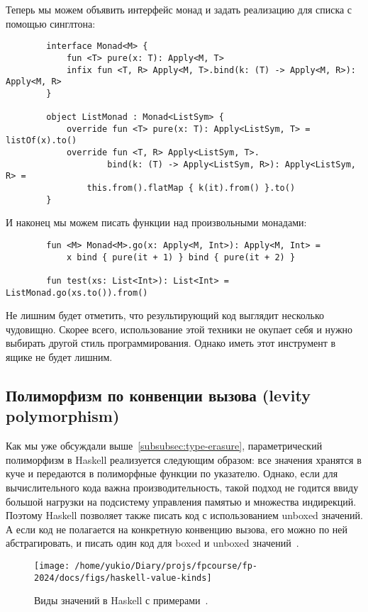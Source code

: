 \documentclass[12pt]{article}
\begin{document}
    Теперь мы можем объявить интерфейс монад и задать реализацию для списка с помощью синглтона:
    \begin{verbatim}
        interface Monad<M> {
            fun <T> pure(x: T): Apply<M, T>
            infix fun <T, R> Apply<M, T>.bind(k: (T) -> Apply<M, R>): Apply<M, R>
        }

        object ListMonad : Monad<ListSym> {
            override fun <T> pure(x: T): Apply<ListSym, T> = listOf(x).to()
            override fun <T, R> Apply<ListSym, T>.
                    bind(k: (T) -> Apply<ListSym, R>): Apply<ListSym, R> =
                this.from().flatMap { k(it).from() }.to()
        }
    \end{verbatim}

    И наконец мы можем писать функции над произвольными монадами:
    \begin{verbatim}
        fun <M> Monad<M>.go(x: Apply<M, Int>): Apply<M, Int> =
            x bind { pure(it + 1) } bind { pure(it + 2) }

        fun test(xs: List<Int>): List<Int> = ListMonad.go(xs.to()).from()
    \end{verbatim}


    Не лишним будет отметить, что результирующий код выглядит несколько чудовищно.
    Скорее всего, использование этой техники не окупает себя и нужно выбирать другой стиль программирования.
    Однако иметь этот инструмент в ящике не будет лишним.

    \subsection{Полиморфизм по конвенции вызова (levity polymorphism)} \label{subsec:levity-polymorphism}

    Как мы уже обсуждали выше~\ref{subsubsec:type-erasure}, параметрический полиморфизм в Haskell реализуется следующим образом: все значения хранятся в куче и передаются в полиморфные функции по указателю.
    Однако, если для вычислительного кода важна производительность, такой подход не годится ввиду большой нагрузки на подсистему управления памятью и множества индирекций.
    Поэтому Haskell позволяет также писать код с использованием unboxed значений.
    А если код не полагается на конкретную конвенцию вызова, его можно по ней абстрагировать, и писать один код для boxed и unboxed значений~\cite{eisenberg2017levity}.

    \begin{figure}[h]
        \centering
        \texttt{[image: /home/yukio/Diary/projs/fpcourse/fp-2024/docs/figs/haskell-value-kinds]}
        \caption{Виды значений в Haskell с примерами~\cite{eisenberg2017levity}.}
        \label{fig:haskell-value-kinds}
    \end{figure}
\end{document}
